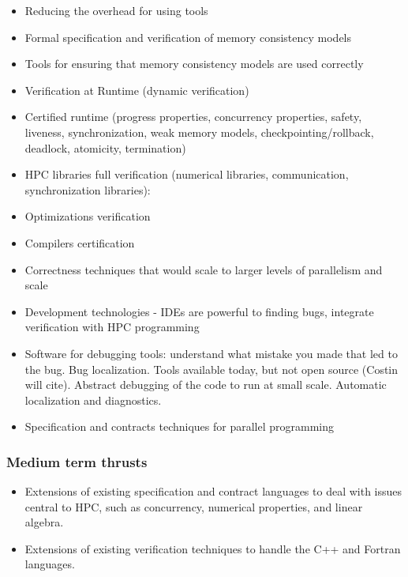 \begin{itemize}
\item Reducing the overhead for using tools

\item Formal specification and verification of memory consistency models

\item Tools for ensuring that memory consistency models are used correctly

\item Verification at Runtime  (dynamic verification)

\item Certified runtime (progress properties, concurrency properties, safety, liveness, synchronization, weak memory models, checkpointing/rollback, deadlock, atomicity, termination)

\item HPC libraries full verification (numerical libraries, communication, synchronization libraries):

\item Optimizations verification

\item Compilers certification

\item Correctness techniques that would scale to larger levels of parallelism and scale

\item Development technologies - IDEs are powerful to finding bugs, integrate verification with HPC programming

\item Software for debugging tools: understand what mistake you made that led to the bug.  Bug localization. Tools available today, but not open source (Costin will cite).  Abstract debugging of the code to run at small scale. Automatic localization and diagnostics.

\item Specification and contracts techniques for parallel programming

\end{itemize}


\subsubsection{Medium term thrusts}

\begin{itemize}
\item Extensions of existing specification and contract languages to deal with issues central to HPC, such as concurrency, numerical properties, and linear algebra.  

\item Extensions of existing verification techniques to handle the C++ and Fortran languages.

\end{itemize}

